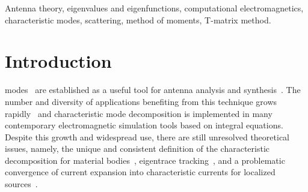 \documentclass[journal]{IEEEtran}
\begin{document}
\begin{IEEEkeywords}
Antenna theory, eigenvalues and eigenfunctions, computational electromagnetics, characteristic modes, scattering, method of moments, T-matrix method.
\end{IEEEkeywords}

\IEEEpeerreviewmaketitle

\section{Introduction}
\label{Sec:Introduction}

 modes~\cite{Garbacz_TCMdissertation,HarringtonMautz_TheoryOfCharacteristicModesForConductingBodies} are established as a useful tool for antenna analysis and synthesis~\cite{MartaEva_TheTCMRevisited, VogelEtAl_CManalysis_PuttingPhysicsBackIntoSimulation}. The number and diversity of applications benefiting from this technique grows rapidly~\cite{ChenWang_CharacteristicModesWiley} and characteristic mode decomposition is implemented in many contemporary electromagnetic simulation tools based on integral equations. Despite this growth and widespread use, there are still unresolved theoretical issues, namely, the unique and consistent definition of the characteristic decomposition for material bodies~\cite{YlaOijala_GeneralizedTCM2019}, eigentrace tracking~\cite{SchabEtAl_EigenvalueCrossingAvoidanceInCM}, and a problematic convergence of current expansion into characteristic currents for localized sources~\cite{YeeGarbacz_SelfAndMutualAdmittancesOfWireAntennasInTermsOfCharModes, Marta_evanVid1}.
\end{document}
